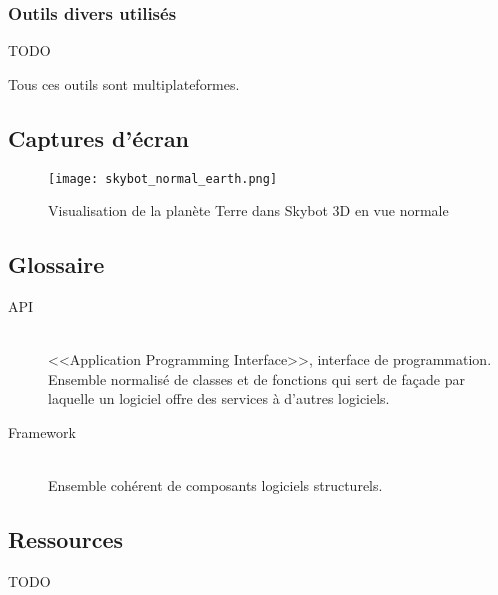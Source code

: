 \documentclass[a4paper,french,12pt]{article}
\begin{document}
		\subsubsection{Outils divers utilisés}
		  \begin{description}
		  		  	\item TODO
		  \end{description}

		Tous ces outils sont multiplateformes.

	\subsection{Captures d'écran}
		\FloatBarrier
		\newpage
		\begin{figure}
			      \centering
			      \texttt{[image: skybot\_normal\_earth.png]}
			      \caption{Visualisation de la planète Terre dans Skybot 3D en vue normale}
		\end{figure}

		

	\newpage

	\subsection{Glossaire}
		\begin{description}

		\item [API]~\\
		    <<Application Programming Interface>>, interface de programmation. Ensemble normalisé de classes et de
		    fonctions qui sert de façade par laquelle un logiciel offre des services à d'autres logiciels.

		\item [Framework]~\\
		    Ensemble cohérent de composants logiciels structurels.
		\end{description}

	\subsection{Ressources}
	  \begin{description}
	 		  	\item TODO
	  \end{description}
\end{document}
